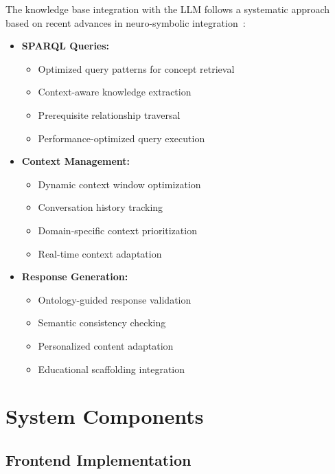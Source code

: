 The knowledge base integration with the LLM follows a systematic approach based on recent advances in neuro-symbolic integration~\cite{funk2023neuro}:

\begin{itemize}
  \item \textbf{SPARQL Queries:} 
    \begin{itemize}
      \item Optimized query patterns for concept retrieval
      \item Context-aware knowledge extraction
      \item Prerequisite relationship traversal
      \item Performance-optimized query execution
    \end{itemize}
  
  \item \textbf{Context Management:} 
    \begin{itemize}
      \item Dynamic context window optimization
      \item Conversation history tracking
      \item Domain-specific context prioritization
      \item Real-time context adaptation
    \end{itemize}
  
  \item \textbf{Response Generation:} 
    \begin{itemize}
      \item Ontology-guided response validation~\cite{hartl2024knowledge}
      \item Semantic consistency checking
      \item Personalized content adaptation
      \item Educational scaffolding integration
    \end{itemize}
\end{itemize}

\section{System Components}
\label{sec:system-components}

\subsection{Frontend Implementation}
\label{subsec:frontend}

